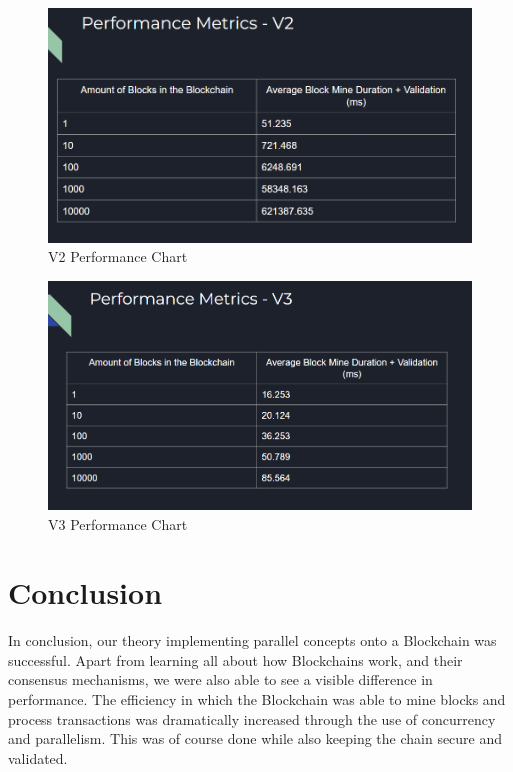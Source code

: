 \begin{figure}[!ht]
   \centering
   \includegraphics[width=120mm]{fig/V2.PNG}
   \caption{V2 Performance Chart}
\end{figure}

\begin{figure}[!ht]
   \centering
   \includegraphics[width=120mm]{fig/V3.PNG}
   \caption{V3 Performance Chart}
\end{figure}

\section{Conclusion}
In conclusion, our theory implementing parallel concepts onto a Blockchain was successful. Apart from learning all about how Blockchains work, and their consensus mechanisms, we were also able to see a visible difference in performance. The efficiency in which the Blockchain was able to mine blocks and process transactions was dramatically increased through the use of concurrency and parallelism. This was of course done while also keeping the chain secure and validated.

~\nocite{frankenfield_2022}
~\nocite{ethereum.org}
~\nocite{adittane_2021}
~\nocite{bitpanda}
~\nocite{mearian_2019}
~\nocite{changelly.com_2021}
~\nocite{vitaliks}
~\nocite{changelly.com_2020}
~\nocite{ethereum.org2}
~\nocite{ethereum.org3}




